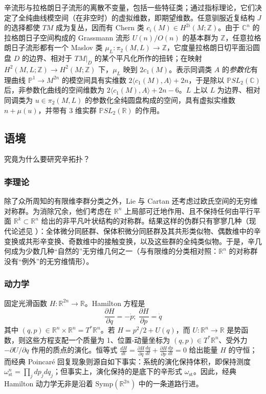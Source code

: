 \documentclass[11pt,a4paper]{article}
\numberwithin{equation}{section}
\newcommand{\bR}{\mathbb{R}}
\newcommand{\bZ}{\mathbb{Z}}
\newcommand{\bC}{\mathbb{C}}
\newcommand{\bP}{\mathbb{P}}
\newcommand{\Symp}{\mathrm{Symp}}
\newcommand{\st}{\operatorname{st}}
\begin{document}
辛流形与拉格朗日子流形的离散不变量，包括一些特征类；通过指标理论，它们决定了全纯曲线模空间（在非空时）的虚拟维数，即期望维数。任意驯服近复结构 $J$ 的选择都使 $TM$ 成为复丛，因而有 Chern 类 $c_i(M) \in H^{2i}(M;\bZ)$。由于 $\bC^n$ 的拉格朗日子空间构成的 Grassmann 流形 $U(n) / O(n)$ 的基本群为 $\bZ$，任意拉格朗日子流形都有一个 Maslov 类 $\mu_L: \pi_2(M,L) \rightarrow \bZ$，它度量拉格朗日切平面沿圆盘 $D$ 的边界、相对于 $TM|_D$ 的某个平凡化所作的扭转；在映射 $H^2(M,L;\bZ) \rightarrow H^2(M;\bZ)$ 下，$\mu_L$ 映到 $2c_1(M)$。表示同调类 $A$ 的\emph{参数化}有理曲线 $\bP^1 \rightarrow M^{2n}$ 的模空间具有实维数 $2\langle c_1(M),A\rangle + 2n$，于是除以 $\bP SL_2(\bC)$ 后，非参数化曲线的空间维数为 $2\langle c_1(M), A\rangle + 2n - 6$。$L$ 上以 $L$ 为边界、相对同调类为 $u \in \pi_2(M,L)$ 的参数化全纯圆盘构成的空间，具有虚拟实维数 $n + \mu(u)$，并带有 3 维实群 $\bP SL_2(\bR)$ 的作用。

\subsection{语境}

究竟为什么要研究辛拓扑？

\subsubsection{李理论}

除了众所周知的有限维李群分类之外，Lie 与 Cartan 还考虑过欧氏空间的无穷维对称群。为消除冗余，他们考虑在 $\bR^n$ 上局部可迁地作用、且不保持任何由平行平面 $\bR^k \subset \bR^n$ 给出的非平凡叶状结构的对称群。结果这样的伪群只有寥寥几种（现代论述见 \cite{SingerSternberg}）：全体微分同胚群、保体积微分同胚群及其共形类似物、偶数维中的辛变换或共形辛变换、奇数维中的接触变换，以及这些群的全纯类似物。于是，辛几何成为少数几种“自然的”无穷维几何之一（与有限维的分类相对照：$\bR^n$ 的对称群没有“例外”的无穷维情形）。

\subsubsection{动力学}

固定光滑函数 $H: \bR^{2n} \rightarrow \bR$。Hamilton 方程是
\[
\frac{\partial H}{\partial q} = -\dot{p}; \ \frac{\partial H}{\partial p} = \dot{q}
\]
其中 $(q,p) \in \bR^n \times \bR^n = T^*\bR^n$。若 $H = p^2/2 + U(q)$，而 $U: \bR^n \rightarrow \bR$ 是势函数，则这些方程支配一个质量为 1、位置-动量坐标为 $(q,p) \in T^*\bR^n$、受外力 $ -\partial U /\partial q$ 作用的质点的演化。恒等式
$
\frac{dH}{dt} =  \frac{\partial H}{\partial q} \frac{dq}{dt} + \frac{\partial H}{\partial p} \frac{dp}{dt} = 0
$
给出能量 $H$ 的守恒；而经典 Poincar\'e 回复现象则源自如下事实：系统的演化保持体积，即保持测度 $\omega_{\st}^n = \prod_j dp_j dq_j$；但事实上，演化保持的是底下的辛形式 $\omega_{\st}$。因此，经典 Hamilton 动力学无非是沿着 $\Symp(\bR^{2n})$ 中的一条道路行进。
\end{document}
